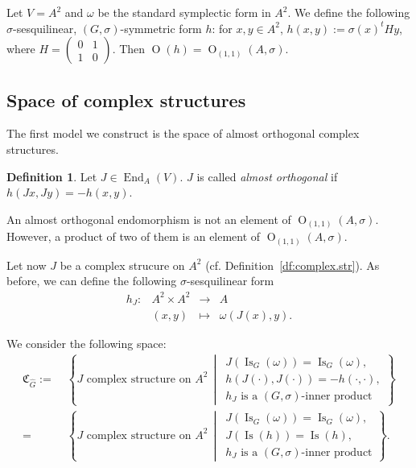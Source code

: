\documentclass[a4paper,oneside,11pt]{amsart}
\DeclareMathOperator{\OO}{O}
\DeclareMathOperator{\End}{End}
\DeclareMathOperator{\Is}{Is}
\newcommand{\midwd}{\,\middle\vert\,}
\theoremstyle{plain}
\theoremstyle{definition}
\newtheorem{df}[teo]{Definition}
\theoremstyle{remark}
\newcommand{\defin}{\emph}
\begin{document}
Let $V=A^2$ and $\omega$ be the standard symplectic form in $A^2$. We define the following $\sigma$-sesquilinear, $(G,\sigma)$-symmetric form $h$: for $x,y\in A^2$, $h(x,y):=\sigma(x)^t H y$, where $H=\begin{pmatrix}
    0 & 1 \\
    1 & 0
\end{pmatrix}$.
Then $\OO(h)=\OO_{(1,1)}(A,\sigma)$.

\subsection{Space of complex structures}\label{G-Comp_Str_Mod}

The first model we construct is the space of almost orthogonal complex structures.

\begin{df}
Let $J\in\End_A(V)$. $J$ is called \defin{almost orthogonal} if $h(Jx,Jy)=-h(x,y)$.
\end{df}

An almost orthogonal endomorphism is not an element of $\OO_{(1,1)}(A,\sigma)$. However, a product of two of them is an element of $\OO_{(1,1)}(A,\sigma)$.

Let now $J$ be a complex strucure on $A^2$ (cf. Definition~\ref{df:complex.str}). As before, we can define the following $\sigma$-sesquilinear form
$$\begin{matrix}
h_J\colon & A^2\times A^2 & \to & A \\
& (x,y) & \mapsto & \omega(J(x),y).
\end{matrix}$$

\noindent We consider the following space:
\begin{align*}
    \mathfrak C_{\hat G}:=&\;\left\{J\text{ complex structure on $A^2$}\midwd\begin{array}{l}
    J(\Is_G(\omega))=\Is_G(\omega),\\
    h(J(\cdot),J(\cdot))=-h(\cdot,\cdot),\\
    h_J\text{ is a $(G,\sigma)$-inner product}
    \end{array}\right\}\\
    =&\;\left\{J\text{ complex structure on $A^2$}\midwd\begin{array}{l}
    J(\Is_G(\omega))=\Is_G(\omega),\\
    J(\Is(h))=\Is(h),\\
    h_J\text{ is a $(G,\sigma)$-inner product}
    \end{array}\right\}.    
\end{align*}
\end{document}
